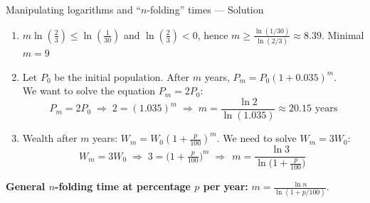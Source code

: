 \documentclass[9pt]{beamer}
\begin{document}
\begin{frame}{Manipulating logarithms and ``$n$-folding'' times — Solution}

\begin{enumerate}[leftmargin=0.5cm, label=\arabic*., rightmargin=0.2cm]
  
  \item $m\ln(\tfrac23)\le\ln(\tfrac1{30})$ and $\ln(\tfrac23)<0$, hence
        $m\ge\frac{\ln(1/30)}{\ln(2/3)}\approx 8.39$. Minimal $m=\boxed{9}$
  
  \item   
  Let $P_0$ be the initial population. After $m$ years, $P_m = P_0(1+0.035)^m$. \\
  We want to solve the equation $P_m=2P_0$:
  \[
    P_m=2P_0 \;\Longrightarrow\; 2=(1.035)^m \;\Longrightarrow\; m=\frac{\ln 2}{\ln(1.035)}\approx \boxed{20.15\text{ years}}
  \]

  \item 
  Wealth after $m$ years: \(W_m=W_0(1+\tfrac{p}{100})^m\).
  We need to solve \(W_m=3W_0\):
  \[
    W_m=3W_0 
    \;\Longrightarrow\;
    3=\bigl(1+\tfrac{p}{100}\bigr)^m
    \;\Longrightarrow\;
    \boxed{\,m=\dfrac{\ln 3}{\ln\!\bigl(1+\tfrac{p}{100}\bigr)}\,}
  \]
\end{enumerate}

\medskip
\centering
\textbf{General $n$-folding time at percentage $p$ per year:}\;
\(\displaystyle m=\frac{\ln n}{\ln(1+p/100)}\).
\end{frame}


    


        
\end{document}
